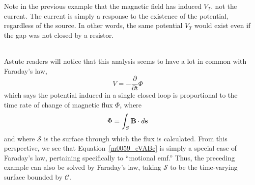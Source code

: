 Note in the previous example that the magnetic field has induced $V_T$, not the current.  The current is simply a response to the existence of the potential, regardless of the source.  In other words, the same potential $V_T$ would exist even if the gap was not closed by a resistor. 

~\\ %

Astute readers will notice that this analysis seems to have a lot in common with Faraday's law,
%
\begin{equation}
V = -\frac{\partial}{\partial t}\Phi
\end{equation}
%
which says the potential induced in a single closed loop is proportional to the time rate of change of magnetic flux $\Phi$, where
%
\begin{equation}
\Phi = \int_{S} {\bf B} \cdot d{\bf s}
\end{equation}
%
and where $\mathcal{S}$ is the surface through which the flux is calculated.
From this perspective, we see that Equation~\ref{m0059_eVABc} is simply a special case of Faraday's law, pertaining specifically to ``motional emf.''
Thus, the preceding example can also be solved by Faraday's law, taking $\mathcal{S}$ to be the time-varying surface bounded by $\mathcal{C}$. 

